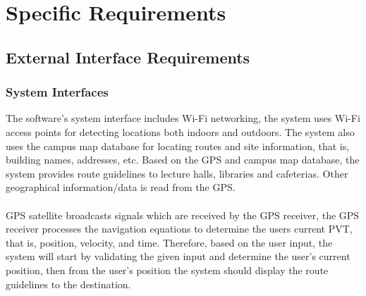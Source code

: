 \documentclass[12pt, a4paper]{article}
\begin{document}
\section{Specific Requirements}
	\subsection{External Interface Requirements}
		\subsubsection{System Interfaces}
The software’s system interface includes Wi-Fi networking, the system uses Wi-Fi access points for detecting locations both indoors and outdoors. 
The system also uses the campus map database for locating routes and site information, that is, building names, addresses, etc. 
Based on the GPS and campus map database, the system provides route guidelines to lecture halls, libraries and cafeterias. 
Other geographical information/data is read from the GPS.\\\\
GPS satellite broadcasts signals which are received by the GPS receiver, the GPS receiver processes the navigation equations 
to determine the users current PVT, that is, position, velocity, and time. Therefore, based on the user input, the system will start by validating 
the given input and determine the user’s current position, then from the user’s position the system should display the route guidelines to the destination.\\
\end{document}
